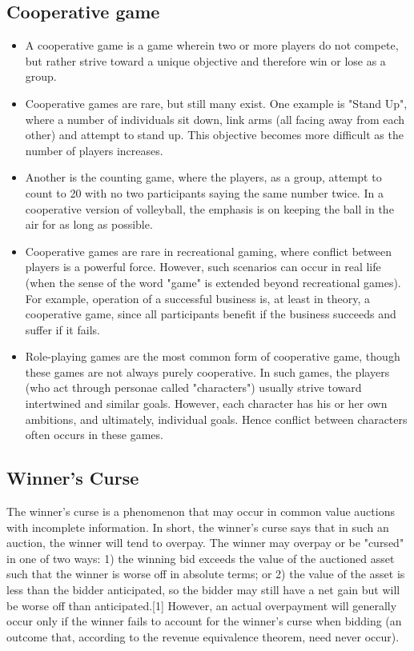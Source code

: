 \documentclass[]{report}
\begin{document}
\subsection{Cooperative game}
\begin{itemize}
	\item A cooperative game is a game wherein two or more players do not compete, but rather strive toward a unique objective and therefore win or lose as a group.
	
	\item 	Cooperative games are rare, but still many exist. One example is "Stand Up", where a number of individuals sit down, link arms (all facing away from each other) and attempt to stand up. This objective becomes more difficult as the number of players increases.
	
	\item 	Another is the counting game, where the players, as a group, attempt to count to 20 with no two participants saying the same number twice. In a cooperative version of volleyball, the emphasis is on keeping the ball in the air for as long as possible.
	
	\item 	Cooperative games are rare in recreational gaming, where conflict between players is a powerful force. However, such scenarios can occur in real life (when the sense of the word "game" is extended beyond recreational games). For example, operation of a successful business is, at least in theory, a cooperative game, since all participants benefit if the business succeeds and suffer if it fails.
	
	\item 	Role-playing games are the most common form of cooperative game, though these games are not always purely cooperative. In such games, the players (who act through personae called "characters") usually strive toward intertwined and similar goals. However, each character has his or her own ambitions, and ultimately, individual goals. Hence conflict between characters often occurs in these games.
\end{itemize}
\subsection{Winner's Curse}
The winner's curse is a phenomenon that may occur in common value auctions with incomplete information. In short, the winner's curse says that in such an auction, the winner will tend to overpay. The winner may overpay or be "cursed" in one of two ways: 1) the winning bid exceeds the value of the auctioned asset such that the winner is worse off in absolute terms; or 2) the value of the asset is less than the bidder anticipated, so the bidder may still have a net gain but will be worse off than anticipated.[1] However, an actual overpayment will generally occur only if the winner fails to account for the winner's curse when bidding (an outcome that, according to the revenue equivalence theorem, need never occur).
\end{document}
